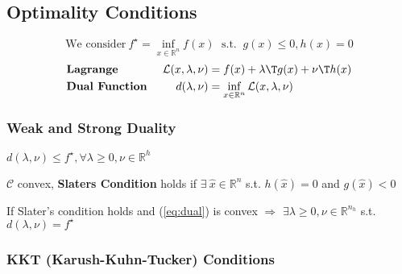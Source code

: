 \subsection{Optimality Conditions}

\begin{equation}
	\text{We consider}\
	f^\star = \inf_{x\in\mathcal{\mathbb{R}}^n}f(x)
	\;\text{ s.t. }\ g(x)\le0,h(x)=0
	\label{eq:dual}
\end{equation}
$$\begin{aligned}
		                           & \textbf{Lagrange }                                              &
		\mathcal{L}(x,\lambda,\nu) & = f(x) + \lambda\T g(x)+\nu\T h(x)
		\\
		                           & \textbf{Dual Function }                                         &
		d(\lambda,\nu)             & = \inf_{x \in \mathcal{\mathbb{R}}^n}\mathcal{L}(x,\lambda,\nu)
	\end{aligned}$$




\subsubsection{Weak and Strong Duality}

\begin{proposition}
	$d(\lambda,\nu)\le f^\star,\forall\lambda\ge0,\nu\in\mathbb{R}^{h}$
\end{proposition}

\begin{definition}
	$\mathcal{C}$ convex, \textbf{Slaters Condition} holds if
	$\exists\ \hat{x} \in \mathbb{R}^{n}$ s.t. $h(\hat{x})=0$ and $g(\hat{x})<0$
\end{definition}

\begin{proposition}
	If Slater's condition holds
	and (\ref{eq:dual}) is convex
	$\Rightarrow$
	$\exists \lambda \ge 0, \nu \in \mathbb{R}^{n_h}$ s.t. $d(\lambda,\nu)=f^\star$
\end{proposition}


\subsubsection{KKT (Karush-Kuhn-Tucker) Conditions}

